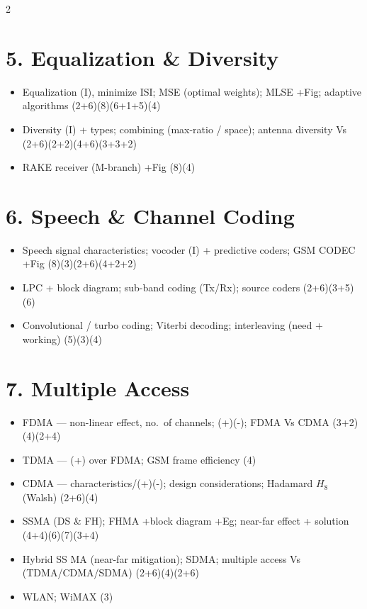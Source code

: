 \documentclass[10pt]{article}
\begin{document}
\begin{multicols}{2}
\section*{5. Equalization \& Diversity}
\begin{itemize}
  \item Equalization (I), minimize ISI; MSE (optimal weights); MLSE +Fig; adaptive algorithms \hfill (2+6)(8)(6+1+5)(4)
  \item Diversity (I) + types; combining (max-ratio / space); antenna diversity Vs \hfill (2+6)(2+2)(4+6)(3+3+2)
  \item RAKE receiver (M-branch) +Fig \hfill (8)(4)
\end{itemize}

\section*{6. Speech \& Channel Coding}
\begin{itemize}
  \item Speech signal characteristics; vocoder (I) + predictive coders; GSM CODEC +Fig \hfill (8)(3)(2+6)(4+2+2)
  \item LPC + block diagram; sub-band coding (Tx/Rx); source coders \hfill (2+6)(3+5)(6)
  \item Convolutional / turbo coding; Viterbi decoding; interleaving (need + working) \hfill (5)(3)(4)
\end{itemize}

\section*{7. Multiple Access}
\begin{itemize}
  \item FDMA --- non-linear effect, no.\ of channels; (+)(-); FDMA Vs CDMA \hfill (3+2)(4)(2+4)
  \item TDMA --- (+) over FDMA; GSM frame efficiency \hfill (4)
  \item CDMA --- characteristics/(+)(-); design considerations; Hadamard $H_8$ (Walsh) \hfill (2+6)(4)
  \item SSMA (DS \& FH); FHMA +block diagram +Eg; near-far effect + solution \hfill (4+4)(6)(7)(3+4)
  \item Hybrid SS MA (near-far mitigation); SDMA; multiple access Vs (TDMA/CDMA/SDMA) \hfill (2+6)(4)(2+6)
  \item WLAN; WiMAX \hfill (3)
\end{itemize}


\end{multicols}
\end{document}
